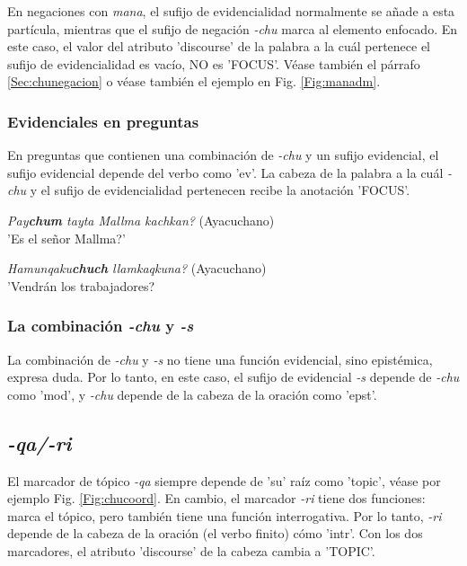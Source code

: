 \documentclass[a4paper,11pt,DIV12]{scrartcl}
\begin{document}
En negaciones con {\em mana}, el sufijo de evidencialidad normalmente se a\~nade a esta part\'icula, mientras que el sufijo de negaci\'on {\em -chu} marca al elemento enfocado. En este caso, el valor del atributo 'discourse' de la palabra a la cu\'al pertenece el sufijo de evidencialidad es vac\'io, NO es 'FOCUS'. V\'ease tambi\'en el p\'arrafo \ref{Sec:chunegacion} o v\'ease tambi\'en el ejemplo en Fig. \ref{Fig:manadm}.

\subsubsection{Evidenciales en preguntas}
En preguntas que contienen una combinaci\'on de {\em -chu} y un sufijo evidencial, el sufijo evidencial depende del verbo como 'ev'. La cabeza de la palabra a la cu\'al {\em -chu} y el sufijo de evidencialidad pertenecen recibe la anotaci\'on 'FOCUS'.

\begin{examples}
 \item {\em Pay\textbf{chum} tayta Mallma kachkan?} (Ayacuchano)\\
      '{\textquestiondown}Es el se\~nor Mallma?'
 \item {\em Hamunqaku\textbf{chuch} llamkaqkuna?} (Ayacuchano)\\
      '{\textquestiondown}Vendr\'an los trabajadores?\\
    		\hfill{\small \citep[120]{Soto76a}}
\end{examples}

\subsubsection{La combinaci\'on {\em -chu} y {\em -s}}\label{Sec:chus}
La combinaci\'on de {\em -chu} y {\em -s} no tiene una funci\'on evidencial, sino epist\'emica, expresa duda. Por lo tanto, en este caso, el sufijo de evidencial {\em -s} depende de {\em -chu} como 'mod', y {\em -chu} depende de la cabeza de la oraci\'on como 'epst'.

   \subsection{{\em-qa/-ri}}
El marcador de t\'opico {\em -qa} siempre depende de 'su' ra\'iz como 'topic', v\'ease por ejemplo Fig. \ref{Fig:chucoord}.
En cambio, el marcador {\em -ri} tiene dos funciones: marca el t\'opico, pero tambi\'en tiene una funci\'on interrogativa. Por lo tanto, {\em -ri} depende de la cabeza de la oraci\'on (el verbo finito) c\'omo 'intr'.
Con los dos marcadores, el atributo 'discourse' de la cabeza cambia a 'TOPIC'. 
\end{document}
